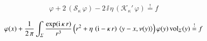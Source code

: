 \documentclass[
	,12pt%
	,pagesize%
	,headings=small%
	,paper=a4%
	,parskip=false%
	,abstract=on
	,toc=bibliography
]{scrartcl}
\theoremstyle{definition}
\theoremstyle{remark}
\begin{document}
\begin{align*}
	\varphi + 2 \, (\mathcal{S}_\kappa \, \varphi) - 2\, \ii \, \eta \, (\mathcal{K}_\kappa' \, \varphi) \stackrel{!}{=} f
\end{align*}

\begin{align*}
	\varphi(x)
	+ 
	\frac{1}{2 \, \pi}  \int_{\varSigma}
		\frac{\exp({\operatorname{i}} \, \kappa \, r)}{r^3} 
		\, 
		\Big(
			r^2 + \eta \, \left({\operatorname{i}} - \kappa \, r\right)\, \langle{y-x,\nu(y)}\rangle
		\Big)
		\, \varphi(y)
	\, {\operatorname{vol}}_\varSigma(y)
	\stackrel{!}{=} f
\end{align*}

%
%
\end{document}
